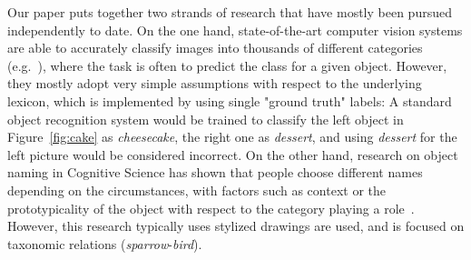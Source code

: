 Our paper puts together two strands of research that have mostly been pursued independently to date.
On the one hand, state-of-the-art computer vision systems are able to accurately classify images into thousands of different categories (e.g.\  ), where the task is often to predict the class for a given object. 
However, they mostly adopt very simple assumptions with respect to the underlying lexicon, which is implemented by using single "ground truth" labels: 
 A standard object recognition system would be trained to classify the left object in Figure~\ref{fig:cake} as \emph{cheesecake}, the right one as \emph{dessert}, and using \emph{dessert} for the left picture would be considered incorrect. 
On the other hand, research on object naming in Cognitive Science has shown that people choose different names depending on the circumstances, with factors such as context or the prototypicality of the object with respect to the category playing a role~\cite{add-refs}. 
However, this research typically uses stylized drawings are used, and is focused on taxonomic relations (\textit{sparrow}-\textit{bird}).






